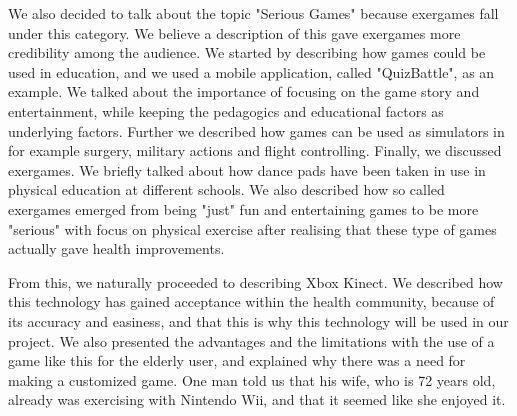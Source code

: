 We also decided to talk about the topic "Serious Games" because exergames fall under this category. We believe a description of this gave exergames more credibility among the audience. We started by describing how games could be used in education, and we used a mobile application, called "QuizBattle", as an example. We talked about the importance of focusing on the game story and entertainment, while keeping the pedagogics and educational factors as underlying factors. Further we described how games can be used as simulators in for example surgery, military actions and flight controlling. Finally, we discussed exergames. We briefly talked about how dance pads have been taken in use in physical education at different schools. We also described how so called exergames emerged from being "just" fun and entertaining games to be more "serious" with focus on physical exercise after realising that these type of games actually gave health improvements.

From this, we naturally proceeded to describing Xbox Kinect. We described how this technology has gained acceptance within the health community, because of its accuracy and easiness, and that this is why this technology will be used in our project. We also presented the advantages and the limitations with the use of a  game like this for the elderly user, and explained why there was a need for making a customized game. One man told us that his wife, who is 72 years old, already was exercising with Nintendo Wii, and that it seemed like she enjoyed it.


